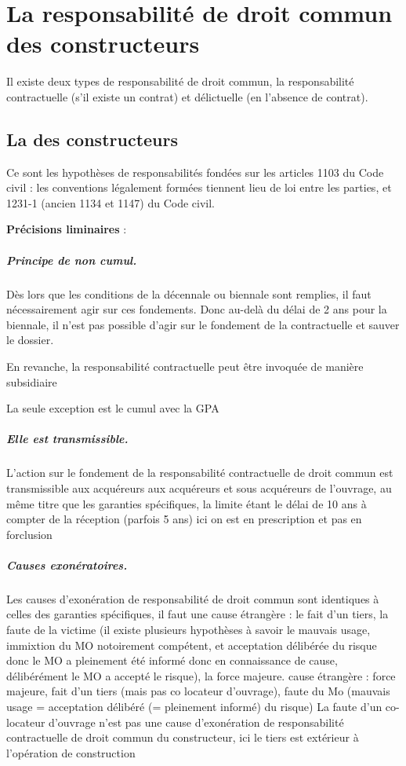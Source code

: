 
\chapter{La responsabilité de droit commun des constructeurs}

Il existe deux types de responsabilité de droit commun, la responsabilité contractuelle (s’il existe un contrat) et délictuelle (en l’absence de contrat).

\section{La \rcdc des constructeurs}

	Ce sont les hypothèses de responsabilités fondées sur les articles 1103 du Code civil : les conventions légalement formées tiennent lieu de loi entre les parties, et 1231-1 (ancien 1134 et 1147) du Code civil.

	\textbf{Précisions liminaires} : 
	\paragraph{Principe de non cumul.} Dès lors que les conditions de la décennale ou biennale sont remplies, il faut nécessairement agir sur ces fondements. Donc au-delà du délai de 2 ans pour la biennale, il n’est pas possible d’agir sur le fondement de la contractuelle et sauver le dossier.

	En revanche, la responsabilité contractuelle peut être invoquée de manière subsidiaire

	La seule exception est le cumul avec la GPA
	\paragraph{Elle est transmissible.} L’action sur le fondement de la responsabilité contractuelle de droit commun est transmissible aux acquéreurs aux acquéreurs et sous acquéreurs de l’ouvrage, au même titre que les garanties spécifiques, la limite étant le délai de 10 ans à compter de la réception (parfois 5 ans) ici on est en prescription et pas en forclusion
	\paragraph{Causes exonératoires.} Les causes d’exonération de responsabilité de droit commun sont identiques à celles des garanties spécifiques, il faut une cause étrangère : le fait d’un tiers, la faute de la victime \MO (il existe plusieurs hypothèses à savoir le mauvais usage, immixtion du MO notoirement compétent, et acceptation délibérée du risque donc le MO a pleinement été informé donc en connaissance de cause, délibérément le MO a accepté le risque), la force majeure.
	cause étrangère : force majeure, fait d'un tiers (mais pas co locateur d'ouvrage), faute du Mo (mauvais usage = acceptation délibéré (= pleinement informé) du risque)
	La faute d’un co-locateur d’ouvrage n’est pas une cause d’exonération de responsabilité contractuelle de droit commun du constructeur, ici le tiers est extérieur à l’opération de construction
